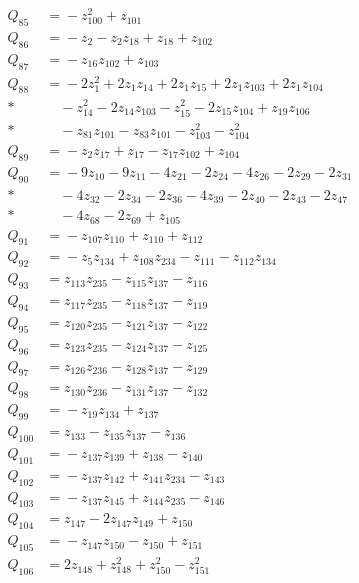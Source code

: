 \begin{align*}
Q_{85} &={}-z_{100}^{2} + z_{101}\\[4pt]
Q_{86} &={}-z_{2} - z_{2}z_{18} + z_{18} + z_{102}\\[4pt]
Q_{87} &={}-z_{16}z_{102} + z_{103}\\[4pt]
Q_{88} &={}-2z_{1}^{2} + 2z_{1}z_{14} + 2z_{1}z_{15} + 2z_{1}z_{103} + 2z_{1}z_{104}\\*
&\quad{} - z_{14}^{2} - 2z_{14}z_{103} - z_{15}^{2} - 2z_{15}z_{104} + z_{19}z_{106}\\*
&\quad{} - z_{81}z_{101} - z_{83}z_{101} - z_{103}^{2} - z_{104}^{2}\\[4pt]
Q_{89} &={}-z_{2}z_{17} + z_{17} - z_{17}z_{102} + z_{104}\\[4pt]
Q_{90} &={}-9z_{10} - 9z_{11} - 4z_{21} - 2z_{24} - 4z_{26} - 2z_{29} - 2z_{31}\\*
&\quad{} - 4z_{32} - 2z_{34} - 2z_{36} - 4z_{39} - 2z_{40} - 2z_{43} - 2z_{47}\\*
&\quad{} - 4z_{68} - 2z_{69} + z_{105}\\[4pt]
Q_{91} &={}-z_{107}z_{110} + z_{110} + z_{112}\\[4pt]
Q_{92} &={}-z_{5}z_{134} + z_{108}z_{234} - z_{111} - z_{112}z_{134}\\[4pt]
Q_{93} &={}z_{113}z_{235} - z_{115}z_{137} - z_{116}\\[4pt]
Q_{94} &={}z_{117}z_{235} - z_{118}z_{137} - z_{119}\\[4pt]
Q_{95} &={}z_{120}z_{235} - z_{121}z_{137} - z_{122}\\[4pt]
Q_{96} &={}z_{123}z_{235} - z_{124}z_{137} - z_{125}\\[4pt]
Q_{97} &={}z_{126}z_{236} - z_{128}z_{137} - z_{129}\\[4pt]
Q_{98} &={}z_{130}z_{236} - z_{131}z_{137} - z_{132}\\[4pt]
Q_{99} &={}-z_{19}z_{134} + z_{137}\\[4pt]
Q_{100} &={}z_{133} - z_{135}z_{137} - z_{136}\\[4pt]
Q_{101} &={}-z_{137}z_{139} + z_{138} - z_{140}\\[4pt]
Q_{102} &={}-z_{137}z_{142} + z_{141}z_{234} - z_{143}\\[4pt]
Q_{103} &={}-z_{137}z_{145} + z_{144}z_{235} - z_{146}\\[4pt]
Q_{104} &={}z_{147} - 2z_{147}z_{149} + z_{150}\\[4pt]
Q_{105} &={}-z_{147}z_{150} - z_{150} + z_{151}\\[4pt]
Q_{106} &={}2z_{148} + z_{148}^{2} + z_{150}^{2} - z_{151}^{2}\\[4pt]

\end{align*}
